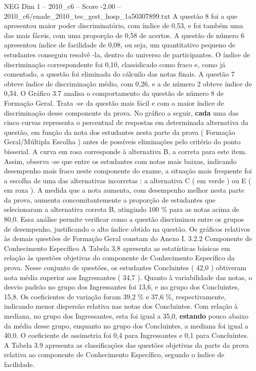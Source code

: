 \begin{textsample}{NEG Dim 1 – 2010\_c6 – Score -2.00 – 2010\_c6/enade\_2010\_tec\_gest\_hosp\_1a50307899.txt}
A questão 8 foi a que apresentou maior poder discriminatório, com índice de 0,53, e foi também uma das mais fáceis, com uma proporção de 0,58 de acertos.
A questão de número 6 apresentou índice de facilidade de 0,08, ou seja, um quantitativo pequeno de estudantes conseguiu resolvê -la, dentro do universo de participantes.
O índice de discriminação correspondente foi 0,10, classidicado como fraco e, como já comentado, a questão foi eliminada do cálcuilo das notas finais.
A questão 7 obteve índice de discriminação médio, com 0,26, e a de número 2 obteve índice de 0,34.
O Gráfico 3.7 analisa o comportamento da questão de número 8 de Formação Geral.
Trata -se da questão mais fácil e com o maior índice de discriminação desse componente da prova.
No gráfico a seguir, \textbf{cada} uma das cinco curvas representa o percentual de respostas em determinada alternativa da questão, em função da nota dos estudantes nesta parte da prova ( Formação Geral/Múltipla Escolha ) antes de possíveis eliminações pelo critério do ponto bisserial.
A curva em rosa corresponde à alternativa B, a correta para este item.
Assim, observa -se que entre os estudantes com notas mais baixas, indicando desempenho mais fraco neste componente do exame, a situação mais frequente foi a escolha de uma das alternativas incorretas : a alternativa C ( em verde ) ou E ( em roxa ).
A medida que a nota aumenta, com desempenho melhor nesta parte da prova, aumenta concomitantemente a proporção de estudantes que selecionaram a alternativa correta B, atingindo 100 \% para as notas acima de 80,0.
Essa análise permite verificar como a questão discriminou entre os grupos de desempenho, justificando o alto índice obtido na questão.
Os gráficos relativos às demais questões de Formação Geral constam do Anexo I. 3.2.2 Componente de Conhecimento Específico A Tabela 3.8 apresenta as estatísticas básicas em relação às questões objetivas do componente de Conhecimento Específico da prova.
Nesse conjunto de questões, os estudantes Concluintes ( 42,0 ) obtiveram nota média superior aos Ingressantes ( 34,7 ).
Quanto à variabilidade das notas, o desvio padrão no grupo dos Ingressantes foi 13,6, e no grupo dos Concluintes, 15,8.
Os coeficientes de variação foram 39,2 \% e 37,6 \%, respectivamente, indicando menor dispersão relativa nas notas dos Concluintes.
Com relação à mediana, no grupo dos Ingressantes, esta foi igual a 35,0, \textbf{estando} pouco abaixo da média desse grupo, enquanto no grupo dos Concluintes, a mediana foi igual a 40,0.
O coeficiente de assimetria foi 0,4 para Ingressantes e 0,1 para Concluintes.
A Tabela 3.9 apresenta as classificações das questões objetivas da parte da prova relativa ao componente de Conhecimento Específico, segundo o índice de facilidade.

\end{textsample}
